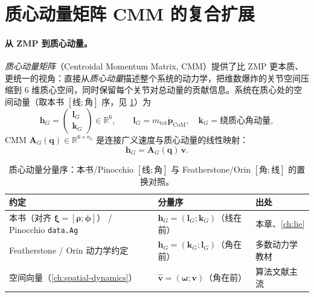 \section{质心动量矩阵 CMM 的复合扩展}
\label{sec:umm-cmm}

\paragraph{从 ZMP 到质心动量。}
\emph{质心动量矩阵}（Centroidal Momentum Matrix, CMM）提供了比 ZMP 更本质、更统一的视角：直接从\emph{质心动量}描述整个系统的动力学，把维数爆炸的关节空间压缩到 $6$ 维质心空间，同时保留每个关节对总动量的贡献信息。系统在质心处的空间动量（取本书 $[\text{线};\text{角}]$ 序，见 \cref{tab:umm-perm}）为
\begin{equation}
  \mathbf h_G=\begin{pmatrix}\mathbf l_G\\ \mathbf k_G\end{pmatrix}\in\mathbb R^6,
  \qquad
  \mathbf l_G=m_{\text{tot}}\dot{\mathbf p}_{\text{CoM}},\quad \mathbf k_G=\text{绕质心角动量},
  \label{eq:umm-hG}
\end{equation}
CMM $\mathbf A_G(\mathbf q)\in\mathbb R^{6\times n_v}$ 是连接广义速度与质心动量的线性映射：
\begin{equation}
  \boxed{\;\mathbf h_G=\mathbf A_G(\mathbf q)\,\mathbf v.\;}
  \label{eq:umm-cmm-def}
\end{equation}

\begin{table}[H]\centering\small
\caption{质心动量分量序：本书/Pinocchio $[\text{线};\text{角}]$ 与 Featherstone/Orin $[\text{角};\text{线}]$ 的置换对照。}
\label{tab:umm-perm}
\begin{tabular}{lll}
\toprule
约定 & 分量序 & 出处 \\
\midrule
本书（对齐 $\boldsymbol\xi=[\boldsymbol\rho;\boldsymbol\phi]$） / Pinocchio \texttt{data.Ag} & $\mathbf h_G=(\mathbf l_G;\mathbf k_G)$（线在前） & 本章、\cref{ch:lie} \\
Featherstone / Orin 动力学约定 & $\mathbf h_G=(\mathbf k_G;\mathbf l_G)$（角在前） & 多数动力学教材 \\
空间向量（\cref{ch:spatial-dynamics}） & $\hat{\mathbf v}=(\boldsymbol\omega;\mathbf v)$（角在前） & 算法文献主流 \\
\bottomrule
\end{tabular}
\end{table}

